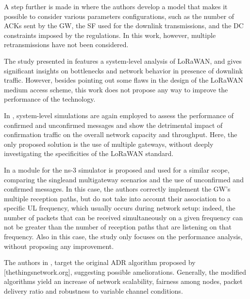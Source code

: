 A step further is made in \cite{capuzzo_mathematical_2018} where the authors develop a model that makes it possible to consider various parameters configurations,
	such as the number of ACKs sent by the GW,
	the SF used for the downlink transmissions,
	and the DC constraints imposed by the regulations.
In this work,
	however,
	multiple retransmissions have not been considered.

The study presented in \cite{pop_does_2017} features a system-level analysis of LoRaWAN,
	and gives significant insights on bottlenecks and network behavior in presence of downlink traffic.
However,
	besides pointing out some flaws in the design of the LoRaWAN medium access scheme,
	this work does not propose any way to improve the performance of the technology.

In \cite{abeele_scalability_2017},
	system-level simulations are again employed to assess the performance of confirmed and unconfirmed messages and show the detrimental impact of confirmation traffic on the overall network capacity and throughput.
Here,
	the only proposed solution is the use of multiple gateways,
	without deeply investigating the specificities of the LoRaWAN standard.

In \cite{reynders_lorawan_2018} a module for the ns-3 simulator is proposed and used for a similar scope,
	comparing the singleand multigateway scenarios and the use of unconfirmed and confirmed messages.
In this case,
	the authors correctly implement the GW’s multiple reception paths,
	but do not take into account their association to a specific UL frequency,
	which usually occurs during network setup:
	indeed,
	the number of packets that can be received simultaneously on a given frequency can not be greater than the number of reception paths that are listening on that frequency.
Also in this case,
	the study only focuses on the performance analysis,
	without proposing any improvement.

The authors in \cite{hauser_proposal_2017},
	\cite{slabicki_adaptive_2018} target the original ADR algorithm proposed by [thethingsnetwork.org],
	suggesting possible ameliorations.
Generally,
	the modified algorithms yield an increase of network scalability,
	fairness among nodes,
	packet delivery ratio and robustness to variable channel conditions.

